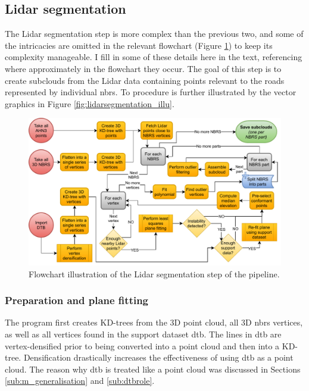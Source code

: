 \subsection{Lidar segmentation}
\label{sub:m_lidarsegmentation}

The Lidar segmentation step is more complex than the previous two, and some of the intricacies are omitted in the relevant flowchart (Figure \ref{fig:lidarsegmentationflow}) to keep its complexity manageable. I fill in some of these details here in the text, referencing where approximately in the flowchart they occur. The goal of this step is to create subclouds from the Lidar data containing points relevant to the roads represented by individual \ac{nbrs}. To procedure is further illustrated by the vector graphics in Figure \ref{fig:lidarsegmentation_illu}.

\begin{figure}
    \centering
    \includegraphics[width=\linewidth]{final_report/figs/lidar_segmentation.pdf}
    \caption[Flowchart illustrating of the Lidar segmentation step]{Flowchart illustration of the Lidar segmentation step of the pipeline.}
    \label{fig:lidarsegmentationflow}
\end{figure}

\subsubsection{Preparation and plane fitting}

The program first creates KD-trees from the 3D point cloud, all 3D \ac{nbrs} vertices, as well as all vertices found in the support dataset \ac{dtb}. The lines in \ac{dtb} are vertex-densified prior to being converted into a point cloud and then into a KD-tree. Densification drastically increases the effectiveness of using \ac{dtb} as a point cloud. The reason why \ac{dtb} is treated like a point cloud was discussed in Sections \ref{sub:m_generalisation} and \ref{sub:dtbrole}.

